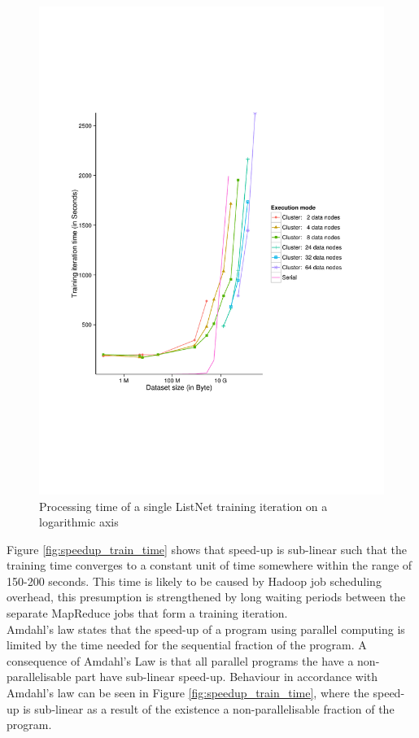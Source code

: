 \begin{figure}[!h]
\centering
\includegraphics[trim=0cm 5cm 0cm 5cm, scale=0.7]{gfx/time_single_logx.pdf}
\caption{Processing time of a single ListNet training iteration on a logarithmic axis}
\label{fig:listnet_train_time_log}
\end{figure}

Figure \ref{fig:speedup_train_time} shows that speed-up is sub-linear such that the training time converges to a constant unit of time somewhere within the range of 150-200 seconds. This time is likely to be caused by Hadoop job scheduling overhead, this presumption is strengthened by long waiting periods between the separate MapReduce jobs that form a training iteration.\\

Amdahl's law states that the speed-up of a program using parallel computing is limited by the time needed for the sequential fraction of the program. A consequence of Amdahl's Law is that all parallel programs the have a non-parallelisable part have sub-linear speed-up. Behaviour in accordance with Amdahl's law can be seen in Figure \ref{fig:speedup_train_time}, where the speed-up is sub-linear as a result of the existence a non-parallelisable fraction of the program.\\

